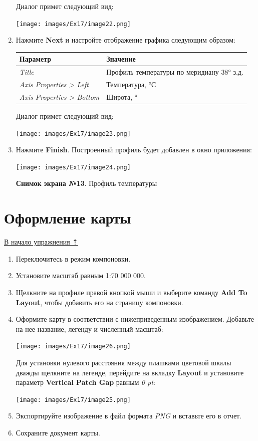 \documentclass[12pt,]{book}
\begin{document}
\begin{enumerate}
  Диалог примет следующий вид:

  \texttt{[image: images/Ex17/image22.png]}
\item
  Нажмите \textbf{Next} и настройте отображение графика следующим образом:

  \begin{longtable}[]{@{}ll@{}}
  \toprule
  Параметр & Значение\tabularnewline
  \midrule
  \endhead
  \emph{Title} & Профиль температуры по меридиану 38° з.д.\tabularnewline
  \emph{Axis Properties \textgreater{} Left} & Температура, °С\tabularnewline
  \emph{Axis Properties \textgreater{} Bottom} & Широта, °\tabularnewline
  \bottomrule
  \end{longtable}

  Диалог примет следующий вид:

  \texttt{[image: images/Ex17/image23.png]}
\item
  Нажмите \textbf{Finish}. Построенный профиль будет добавлен в окно
  приложения:

  \texttt{[image: images/Ex17/image24.png]}

  \textbf{Снимок экрана №13}. Профиль температуры
\end{enumerate}

\hypertarget{interpolation-map-design}{%
\section{Оформление карты}\label{interpolation-map-design}}

\protect\hyperlink{interpolation}{В начало упражнения ⇡}

\begin{enumerate}
\def\labelenumi{\arabic{enumi}.}
\item
  Переключитесь в режим компоновки.
\item
  Установите масштаб равным 1:70 000 000.
\item
  Щелкните на профиле правой кнопкой мыши и выберите команду \textbf{Add To Layout}, чтобы добавить его на страницу компоновки.
\item
  Оформите карту в соответствии с нижеприведенным изображением. Добавьте на нее название, легенду и численный масштаб:

  \texttt{[image: images/Ex17/image26.png]}

  Для установки нулевого расстояния между плашками цветовой шкалы дважды щелкните на легенде, перейдите на вкладку \textbf{Layout} и установите параметр \textbf{Vertical Patch Gap} равным \emph{0 pt}:

  \texttt{[image: images/Ex17/image25.png]}
\item
  Экспортируйте изображение в файл формата \emph{PNG} и вставьте его в отчет.
\item
  Сохраните документ карты.
\end{enumerate}
\end{document}
